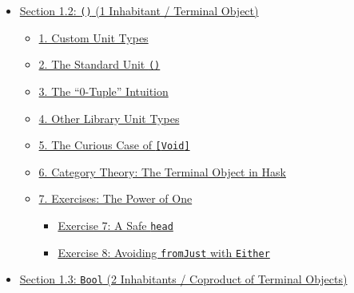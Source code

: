 \documentclass[
]{article}
\providecommand{\tightlist}{%
  \setlength{\itemsep}{0pt}\setlength{\parskip}{0pt}}
\begin{document}
\begin{itemize}
\begin{itemize}
\begin{itemize}
      \begin{itemize}
      \tightlist
      \item
        \hyperref[exercise-5-phantom-status]{Exercise 5: Phantom Status}
      \item
        \hyperref[exercise-6-a-tree-without-leaves]{Exercise 6: A Tree
        Without Leaves}
      \end{itemize}
    \item
      \hyperref[5-category-theory-the-initial-object-in-hask]{5.
      Category Theory: The Initial Object in Hask}
    \end{itemize}
  \item
    \hyperref[section-12--1-inhabitant--terminal-object]{Section 1.2:
    \texttt{()} (1 Inhabitant / Terminal Object)}

    \begin{itemize}
    \tightlist
    \item
      \hyperref[1-custom-unit-types]{1. Custom Unit Types}
    \item
      \hyperref[2-the-standard-unit-]{2. The Standard Unit \texttt{()}}
    \item
      \hyperref[3-the-0-tuple-intuition]{3. The ``0-Tuple'' Intuition}
    \item
      \hyperref[4-other-library-unit-types]{4. Other Library Unit Types}
    \item
      \hyperref[5-the-curious-case-of-void]{5. The Curious Case of
      \texttt{{[}Void{]}}}
    \item
      \hyperref[6-category-theory-the-terminal-object-in-hask]{6.
      Category Theory: The Terminal Object in Hask}
    \item
      \hyperref[7-exercises-the-power-of-one]{7. Exercises: The Power of
      One}

      \begin{itemize}
      \tightlist
      \item
        \hyperref[exercise-7-a-safe-head]{Exercise 7: A Safe
        \texttt{head}}
      \item
        \hyperref[exercise-8-avoiding-fromjust-with-either]{Exercise 8:
        Avoiding \texttt{fromJust} with \texttt{Either}}
      \end{itemize}
    \end{itemize}
  \item
    \hyperref[section-13-bool-2-inhabitants--coproduct-of-terminal-objects]{Section
    1.3: \texttt{Bool} (2 Inhabitants / Coproduct of Terminal Objects)}


\end{itemize}
\end{itemize}
\end{document}
